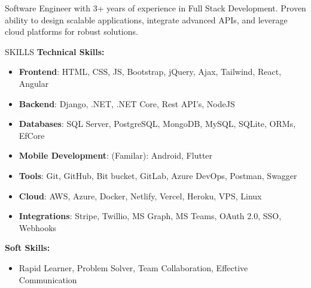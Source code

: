\documentclass{resume} %
\begin{document}

\begin{rSection}%

{Software Engineer with 3+ years of experience in Full Stack Development. Proven ability to design scalable applications, integrate advanced APIs, and leverage cloud platforms for robust solutions. %
}


\end{rSection}


\begin{rSection}{SKILLS}
\textbf{Technical Skills:}
\begin{itemize}
	\item \textbf{Frontend}: HTML, CSS, JS, Bootstrap, jQuery, Ajax, Tailwind, React, Angular
	\item \textbf{Backend}:  Django, .NET, .NET Core, Rest API's, NodeJS
	\item \textbf{Databases}: SQL Server, PostgreSQL, MongoDB, MySQL, SQLite, ORMs, EfCore
	\item \textbf{Mobile Development}: (Familar): Android, Flutter
	\item \textbf{Tools}: Git, GitHub, Bit bucket, GitLab, Azure DevOps, Postman, Swagger
	\item \textbf{Cloud}: AWS, Azure, Docker, Netlify, Vercel, Heroku, VPS, Linux
	\item \textbf{Integrations}: Stripe, Twillio, MS Graph, MS Teams, OAuth 2.0, SSO, Webhooks
	
\end{itemize}


\textbf{Soft Skills:} 
\begin{itemize}
\item Rapid Learner, Problem Solver, Team Collaboration, Effective Communication
\end{itemize}


\end{rSection}
\end{document}
